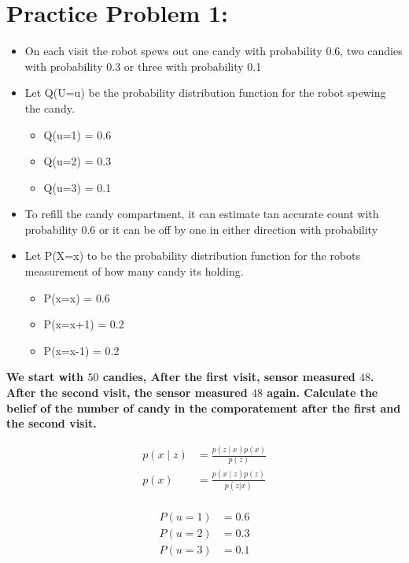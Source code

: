 \section{Practice Problem 1:}
\begin{itemize}
  \item On each visit the robot spews out one candy with probability $0.6$, two candies with probability 0.3 or three with probability 0.1
  \item Let Q(U=u) be the probability distribution function for the robot spewing the candy.
  \begin{itemize}
    \item Q(u=1) = 0.6
    \item Q(u=2) = 0.3
    \item Q(u=3) = 0.1
  \end{itemize}
  \item To refill the candy compartment, it can estimate tan accurate count with probability 0.6 or it can be off by one in either direction with probability
  \item Let P(X=x) to be the probability distribution function for the robots measurement of how many candy its holding.
  \begin{itemize}
    \item P(x=x) = 0.6
    \item P(x=x+1) = 0.2
    \item P(x=x-1) = 0.2
  \end{itemize}
\end{itemize}

\textbf{We start with $50$ candies, After the first visit, sensor measured $48$.
After the second visit, the sensor measured $48$ again. Calculate the belief of the number of candy in the comporatement after the first and the second visit.
}

\begin{align}
  p(x \mid z) &= \frac{p(z \mid x)p(x)}{p(z)} \\
  p(x) &= \frac{p(x \mid z)p(z)}{p(z | x)} \\
  \label{eq:Bayes Rule}
\end{align}

\begin{align}
  P(u = 1) &= 0.6 \\
  P(u = 2) &= 0.3 \\
  P(u = 3) &= 0.1 \\
  \label{eq: Action Probability Distributions}
\end{align}

